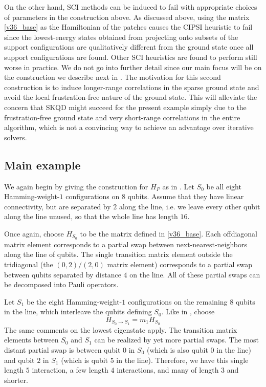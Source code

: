 \documentclass[
  reprint,            %
  amsmath,amssymb,
  aps,
  superscriptaddress, %
  longbibliography
]{revtex4-2}
\theoremstyle{definition}
\begin{document}
On the other hand, SCI methods can be induced to fail with appropriate choices of parameters in the construction above.
As discussed above, using the matrix \eqref{v36_base} as the Hamiltonian of the patches causes the CIPSI heuristic to fail since the lowest-energy states obtained from projecting onto subsets of the support configurations are qualitatively different from the ground state once all support configurations are found.
Other SCI heuristics are found to perform still worse in practice.
We do not go into further detail since our main focus will be on the construction we describe next in .
The motivation for this second construction is to induce longer-range correlations in the sparse ground state and avoid the local frustration-free nature of the ground state.
This will alleviate the concern that SKQD might succeed for the present example simply due to the frustration-free ground state and very short-range correlations in the entire algorithm, which is not a convincing way to achieve an advantage over iterative solvers.


\subsection{Main example}
\label{v57}

We again begin by giving the construction for $H_P$ as in .
Let $S_0$ be all eight Hamming-weight-$1$ configurations on $8$ qubits.
Assume that they have linear connectivity, but are separated by $2$ along the line, i.e. we leave every other qubit along the line unused, so that the whole line has length $16$.

Once again, choose $H_{S_0}$ to be the matrix defined in \eqref{v36_base}.
Each offdiagonal matrix element corresponds to a partial swap between next-nearest-neighbors along the line of qubits.
The single transition matrix element outside the tridiagonal (the $(0,2)/(2,0)$ matrix element) corresponds to a partial swap between qubits separated by distance $4$ on the line.
All of these partial swaps can be decomposed into Pauli operators.

Let $S_1$ be the eight Hamming-weight-$1$ configurations on the remaining $8$ qubits in the line, which interleave the qubits defining $S_0$.
Like in , choose
\begin{equation}
\label{m1_def}
    H_{S_0\rightarrow S_1}=m_1H_{S_0}
\end{equation}
The same comments on the lowest eigenstate apply.
The transition matrix elements between $S_0$ and $S_1$ can be realized by yet more partial swaps.
The most distant partial swap is between qubit $0$ in $S_0$ (which is also qubit $0$ in the line) and qubit $2$ in $S_1$ (which is qubit $5$ in the line).
Therefore, we have this single length $5$ interaction, a few length $4$ interactions, and many of length $3$ and shorter.
\end{document}
